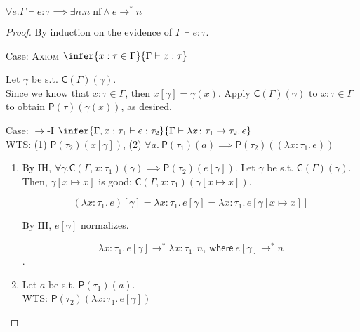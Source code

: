 \documentclass{lecturenotes}
\newcommand{\tabs}[3]{\ensuremath{\lambda #1 \colon #2.\,#3}}
\newcommand{\nf}[1]{#1\;\text{nf}}
\newcommand{\lr}[2]{\ensuremath{\mathsf{P}(#1)(#2)}}
\newcommand{\gdsubst}[2]{\ensuremath{\mathsf{C}(#1)(#2)}}
\newcommand{\proves}{\vdash}
\begin{document}
\begin{thm}
  \label{thm:strong-norm}
  $\forall e. \Gamma \proves e : \tau \implies \exists n. \nf{n} \land e \to^\ast n$
\end{thm}
\begin{proof}
  By induction on the evidence of $\Gamma \proves e : \tau$.

  \item Case: \textsc{Axiom} $\infer{x : \tau \in \Gamma}{\Gamma \proves x : \tau}$
  
  Let $\gamma$ be s.t. $\gdsubst{\Gamma}{\gamma}$. \\
  
  Since we know that $x : \tau \in \Gamma$, then $x[\gamma] = \gamma(x)$.
  Apply $\gdsubst{\Gamma}{\gamma}$ to $x : \tau \in \Gamma$ to obtain $\lr{\tau}{\gamma(x)}$, as desired.

  \item Case: \textsc{$\rightarrow$-I} $\infer{\Gamma, x : \tau_1 \proves e : \tau_2}{\Gamma \proves \tabs{x}{\tau_1 \to \tau_2}{e}}$ \\

  WTS: (1) $\lr{\tau_2}{x[\gamma]}$, (2) $\forall a.~\lr{\tau_1}{a} \implies \lr{\tau_2}{(\tabs{x}{\tau_1}{e})}$ \\

  \begin{enumerate}[(1)]
    \item 
    
    By IH, $\forall \gamma. \gdsubst{\Gamma, x : \tau_1}{\gamma} \implies \lr{\tau_2}{e[\gamma]}$.
    Let $\gamma$ be s.t. $\gdsubst{\Gamma}{\gamma}$.
    Then, $\gamma[x \mapsto x]$ is good: $\gdsubst{\Gamma, x : \tau_1}{\gamma[x \mapsto x]}$.
  
    $$(\tabs{x}{\tau_1}{e})[\gamma] = \tabs{x}{\tau_1}{e[\gamma]} = \tabs{x}{\tau_1}{e[\gamma[x \mapsto x]]}$$
  
    \begin{nb}
    By IH, $e[\gamma]$ normalizes.
    \end{nb}

    $$\tabs{x}{\tau_1}{e[\gamma]} \to^\ast \tabs{x}{\tau_1}{n}\mathsf{,~where }~e[\gamma] \to^\ast n$$.

    \item
    
    Let $a$ be s.t. $\lr{\tau_1}{a}$. \\

    WTS: $\lr{\tau_2}{\tabs{x}{\tau_1}{e[\gamma]}}$ \\


\end{enumerate}
\end{proof}
\end{document}
